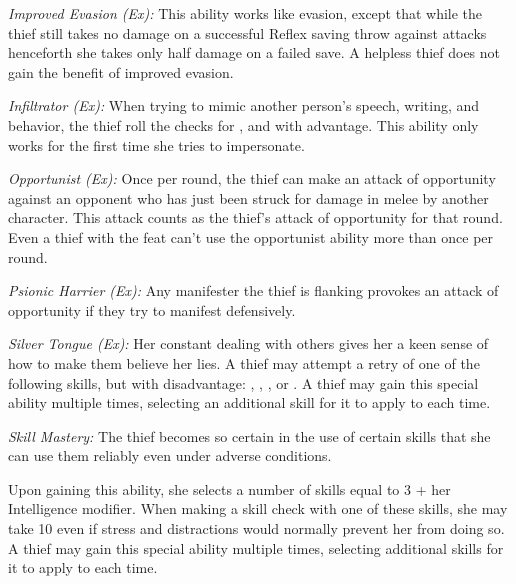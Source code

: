 \textit{Improved Evasion (Ex):} This ability works like evasion, except that while the thief still takes no damage on a successful Reflex saving throw against attacks henceforth she takes only half damage on a failed save. A helpless thief does not gain the benefit of improved evasion.

\textit{Infiltrator (Ex):} When trying to mimic another person's speech, writing, and behavior, the thief roll the checks for ,  and  with advantage. This ability only works for the first time she tries to impersonate.



\textit{Opportunist (Ex):} Once per round, the thief can make an attack of opportunity against an opponent who has just been struck for damage in melee by another character. This attack counts as the thief's attack of opportunity for that round. Even a thief with the  feat can't use the opportunist ability more than once per round.

\textit{Psionic Harrier (Ex):} Any manifester the thief is flanking provokes an attack of opportunity if they try to manifest defensively.

\textit{Silver Tongue (Ex):} Her constant dealing with others gives her a keen sense of how to make them believe her lies. A thief may attempt a retry of one of the following skills, but with disadvantage: , , , or . A thief may gain this special ability multiple times, selecting an additional skill for it to apply to each time.

\textit{Skill Mastery:} The thief becomes so certain in the use of certain skills that she can use them reliably even under adverse conditions.

Upon gaining this ability, she selects a number of skills equal to 3 + her Intelligence modifier. When making a skill check with one of these skills, she may take 10 even if stress and distractions would normally prevent her from doing so. A thief may gain this special ability multiple times, selecting additional skills for it to apply to each time.

